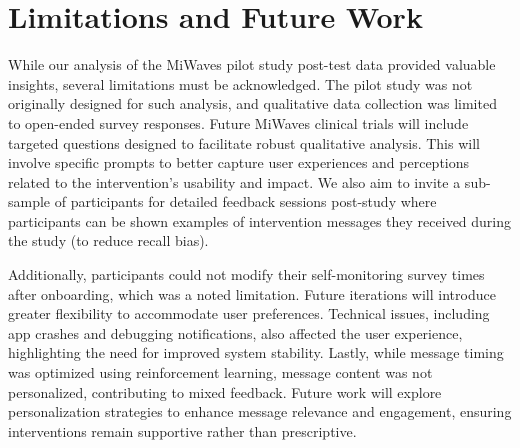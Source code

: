 \section{Limitations and Future Work}
\label{sec:limitations_future}

While our analysis of the MiWaves pilot study post-test data provided valuable insights, several limitations must be acknowledged. The pilot study was not originally designed for such analysis, and qualitative data collection was limited to open-ended survey responses.
Future MiWaves clinical trials will include targeted questions designed to facilitate robust qualitative analysis. 
This will involve specific prompts to better capture user experiences and perceptions related to the intervention’s usability and impact. 
We also aim to invite a sub-sample of participants for detailed feedback sessions post-study where participants can be shown examples of intervention messages they received during the study (to reduce recall bias). 

Additionally, participants could not modify their self-monitoring survey times after onboarding, which was a noted limitation. Future iterations will introduce greater flexibility to accommodate user preferences. Technical issues, including app crashes and debugging notifications, also affected the user experience, highlighting the need for improved system stability. Lastly, while message timing was optimized using reinforcement learning, message content was not personalized, contributing to mixed feedback. Future work will explore personalization strategies to enhance message relevance and engagement, ensuring interventions remain supportive rather than prescriptive.


